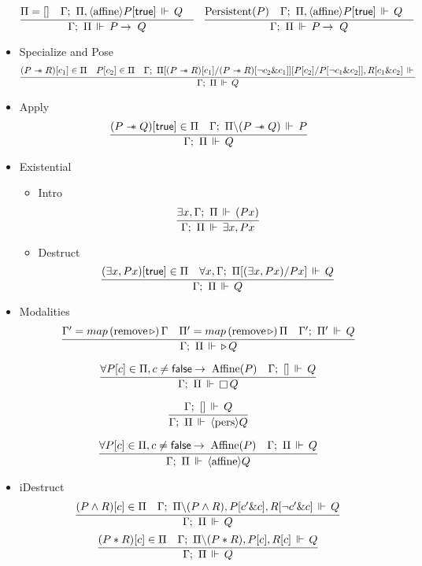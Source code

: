\begin{itemize}
  \begin{equation*}
  \infer{\entailsD P \imp Q}
        {\SpatD = [] &
          \entails {\IntuD} {\SpatD , \affine P[\true]} {Q} &
        }
   \quad
  \infer{\entailsD P \imp Q}
        {\Persistent P &
         \entails {\IntuD} {\SpatD , \affine P[\true]} {Q} &
        }
  \end{equation*}
\item Specialize and Pose
  \[
  \infer{\entailsD Q}
        {(P \wand R)[c_1] \in \SpatD &
         P[c_2] \in \SpatD &
         \entails{\IntuD}{\SpatD [(P \wand R)[c_1] /
                                  (P \wand R)[\neg c_2 \& c_1]]
                                 [P[c_2] / P [\neg c_1 \& c_2]],
                                 R[ c_1 \& c_2]}}
  \]
\item Apply
  \[
  \infer{\entailsD Q}
        {(P \wand Q)[\true] \in \SpatD &
         \entails \IntuD {\SpatD \backslash (P \wand Q)} {P}}
  \]
\item Existential
  \begin{itemize}
  \item Intro
    \[
    \infer{\entailsD \exists x, P x}
          {\exists x, \entailsD (P x)}
    \]
  \item Destruct
    \[
    \infer{\entailsD Q}
          {(\exists x, P x)[\true] \in \SpatD &
           \forall x, \entails \IntuD {\SpatD [(\exists x, P x) / P x]} Q}
    \]
  \end{itemize}
\item Modalities
  \[
  \infer{\entailsD {\later Q}}
        {\IntuD' = \mathop{map} {(\text{remove} \later)}\, {\IntuD}  &
         {\SpatD}' = \mathop{map} {(\text{remove} \later)}\, {\SpatD}  &
         \entails {\IntuD'} {\SpatD'} {Q}}
  \]

  \[
  \infer{\entailsD {\intuit Q}}
        {\forall P[c] \in \SpatD, c \neq \false \imp \Affine P &
         \entails \IntuD {[]} Q}
  \]

  \[
  \infer{\entailsD {\pers Q}}
        {\entails \IntuD {[]} Q}
  \]

  \[
  \infer{\entailsD {\affine Q}}
        {\forall P[c] \in \SpatD, c \neq \false \imp \Affine P &
         \entailsD Q}
  \]
\item iDestruct
  \[
  \infer{\entailsD Q}
        {(P \wedge R)[c] \in \SpatD &
         \entails {\IntuD}
                  {\SpatD \backslash (P \wedge R), P[c' \& c], R [\neg c' \& c]}
                  {Q}}
  \]
  \[
  \infer{\entailsD Q}
        {(P \ast R)[c] \in \SpatD &
         \entails {\IntuD} {\SpatD \backslash (P \ast R), P[c], R [c]} Q}
  \]
\end{itemize}

